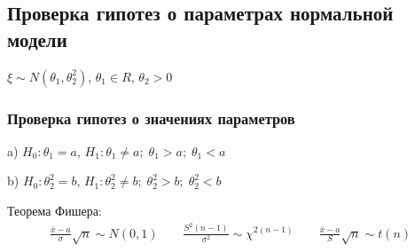 \documentclass{article}
\begin{document}
\subsection{Проверка гипотез о параметрах нормальной модели}
$\xi \sim N(\theta_1, \theta_2^{2})$, $\theta_1 \in R$, $\theta_2 > 0$
\subsubsection{Проверка гипотез о значениях параметров}
a) $H_0: \theta_1=a$, $H_1: \theta_1 \neq a; \; \theta_1 > a; \; \theta_1 < a$

b) $H_0: \theta_2^{2}=b$, $H_1: \theta_2^{2} \neq b; \; \theta_2^{2} > b; \; \theta_2^{2} < b$

Теорема Фишера:
\begin{gather*}
\frac{\bar{x}-a}{\sigma}\sqrt{n}\sim N(0,1)  \qquad \frac{S^{2}(n-1)}{\sigma^{2}} \sim \chi^{2(n-1)} \qquad \frac{\bar{x}-a}{S}\sqrt{n}\sim t(n)
\end{gather*}
\end{document}
